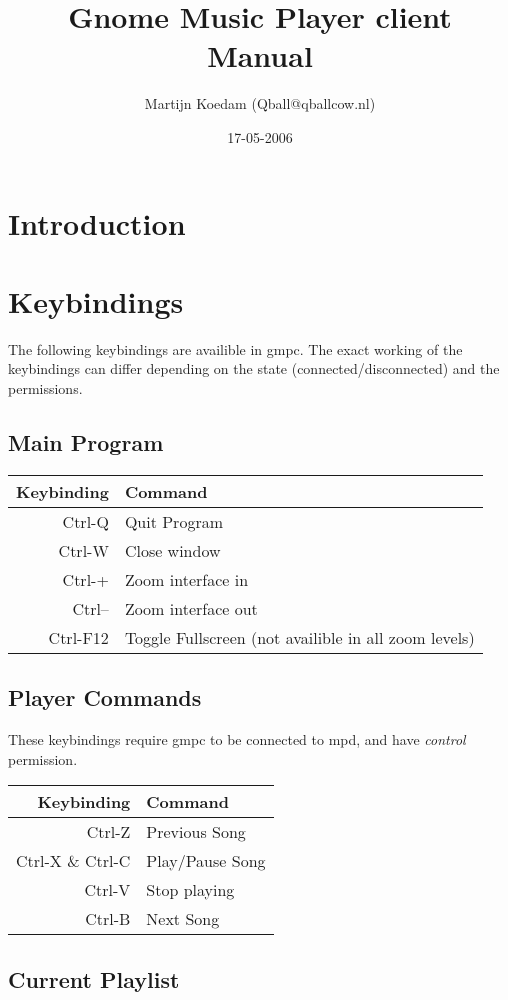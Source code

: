 \documentclass{article}
\begin{document}
\title{Gnome Music Player client\\Manual}
\author{Martijn Koedam (Qball@qballcow.nl)}
\date{17-05-2006}
\maketitle

\section{Introduction}
\section{Keybindings}
The following keybindings are availible in gmpc. The exact working of the keybindings can differ depending on the state (connected/disconnected) and the permissions.
\subsection{Main Program}
\begin{tabular}{r|l}
Keybinding&Command\\
\hline
Ctrl-Q&Quit Program\\
Ctrl-W&Close window\\
Ctrl-+&Zoom interface in\\
Ctrl--&Zoom interface out\\
Ctrl-F12&Toggle Fullscreen (not availible in all zoom levels)\\
\end{tabular}

\subsection{Player Commands}
These keybindings require gmpc to be connected to mpd, and have \textit{control} permission.\\

\begin{tabular}{r|l}
Keybinding&Command\\
\hline
Ctrl-Z&Previous Song\\
Ctrl-X \& Ctrl-C&Play/Pause Song\\
Ctrl-V&Stop playing\\
Ctrl-B&Next Song\\
\end{tabular}

\subsection{Current Playlist}
\end{document}
